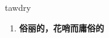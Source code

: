 
\begin{frame}
{\huge tawdry}
\begin{center}
\begin{enumerate}\Large
  \item \textbf{俗丽的，花哨而庸俗的}
\end{enumerate}
\end{center}
\end{frame}
